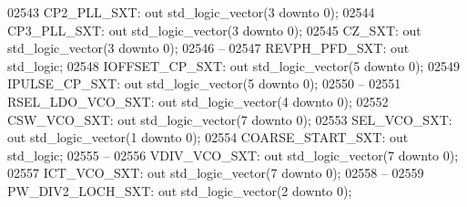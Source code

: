 \begin{DoxyCode}
02543     CP2\_PLL\_SXT:    \textcolor{keywordflow}{out} \textcolor{comment}{std\_logic\_vector}(\textcolor{vhdllogic}{}\textcolor{vhdllogic}{3} \textcolor{keywordflow}{downto} \textcolor{vhdllogic}{}\textcolor{vhdllogic}{0});
02544     CP3\_PLL\_SXT:    \textcolor{keywordflow}{out} \textcolor{comment}{std\_logic\_vector}(\textcolor{vhdllogic}{}\textcolor{vhdllogic}{3} \textcolor{keywordflow}{downto} \textcolor{vhdllogic}{}\textcolor{vhdllogic}{0});
02545     CZ\_SXT: \textcolor{keywordflow}{out} \textcolor{comment}{std\_logic\_vector}(\textcolor{vhdllogic}{}\textcolor{vhdllogic}{3} \textcolor{keywordflow}{downto} \textcolor{vhdllogic}{}\textcolor{vhdllogic}{0});
02546 \textcolor{keyword}{    --}
02547     REVPH\_PFD\_SXT:  \textcolor{keywordflow}{out} \textcolor{comment}{std\_logic};
02548     IOFFSET\_CP\_SXT: \textcolor{keywordflow}{out} \textcolor{comment}{std\_logic\_vector}(\textcolor{vhdllogic}{}\textcolor{vhdllogic}{5} \textcolor{keywordflow}{downto} \textcolor{vhdllogic}{}\textcolor{vhdllogic}{0});
02549     IPULSE\_CP\_SXT:  \textcolor{keywordflow}{out} \textcolor{comment}{std\_logic\_vector}(\textcolor{vhdllogic}{}\textcolor{vhdllogic}{5} \textcolor{keywordflow}{downto} \textcolor{vhdllogic}{}\textcolor{vhdllogic}{0});
02550 \textcolor{keyword}{    --}
02551     RSEL\_LDO\_VCO\_SXT:   \textcolor{keywordflow}{out} \textcolor{comment}{std\_logic\_vector}(\textcolor{vhdllogic}{}\textcolor{vhdllogic}{4} \textcolor{keywordflow}{downto} \textcolor{vhdllogic}{}\textcolor{vhdllogic}{0});
02552     CSW\_VCO\_SXT:    \textcolor{keywordflow}{out} \textcolor{comment}{std\_logic\_vector}(\textcolor{vhdllogic}{}\textcolor{vhdllogic}{7} \textcolor{keywordflow}{downto} \textcolor{vhdllogic}{}\textcolor{vhdllogic}{0});
02553     SEL\_VCO\_SXT:    \textcolor{keywordflow}{out} \textcolor{comment}{std\_logic\_vector}(\textcolor{vhdllogic}{}\textcolor{vhdllogic}{1} \textcolor{keywordflow}{downto} \textcolor{vhdllogic}{}\textcolor{vhdllogic}{0});
02554     COARSE\_START\_SXT:   \textcolor{keywordflow}{out} \textcolor{comment}{std\_logic};
02555 \textcolor{keyword}{    --}
02556     VDIV\_VCO\_SXT:   \textcolor{keywordflow}{out} \textcolor{comment}{std\_logic\_vector}(\textcolor{vhdllogic}{}\textcolor{vhdllogic}{7} \textcolor{keywordflow}{downto} \textcolor{vhdllogic}{}\textcolor{vhdllogic}{0});
02557     ICT\_VCO\_SXT:    \textcolor{keywordflow}{out} \textcolor{comment}{std\_logic\_vector}(\textcolor{vhdllogic}{}\textcolor{vhdllogic}{7} \textcolor{keywordflow}{downto} \textcolor{vhdllogic}{}\textcolor{vhdllogic}{0});
02558 \textcolor{keyword}{    --}
02559     PW\_DIV2\_LOCH\_SXT:   \textcolor{keywordflow}{out} \textcolor{comment}{std\_logic\_vector}(\textcolor{vhdllogic}{}\textcolor{vhdllogic}{2} \textcolor{keywordflow}{downto} \textcolor{vhdllogic}{}\textcolor{vhdllogic}{0});

\end{DoxyCode}
